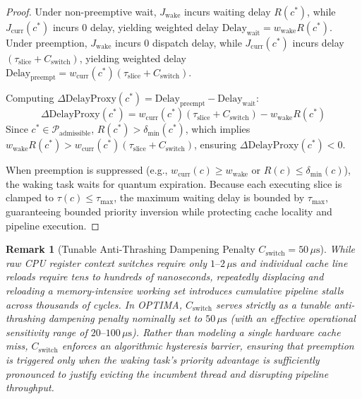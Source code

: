 \documentclass[conference]{IEEEtran}
\newtheorem{remark}{Remark}
\begin{document}
\begin{proof}
Under non-preemptive wait, $J_{\mathrm{wake}}$ incurs waiting delay $R(c^*)$, while $J_{\mathrm{curr}}(c^*)$ incurs 0 delay, yielding weighted delay $\mathrm{Delay}_{\mathrm{wait}} = w_{\mathrm{wake}} R(c^*)$. Under preemption, $J_{\mathrm{wake}}$ incurs 0 dispatch delay, while $J_{\mathrm{curr}}(c^*)$ incurs delay $(\tau_{\mathrm{slice}} + C_{\mathrm{switch}})$, yielding weighted delay $\mathrm{Delay}_{\mathrm{preempt}} = w_{\mathrm{curr}}(c^*) (\tau_{\mathrm{slice}} + C_{\mathrm{switch}})$.

Computing $\Delta\mathrm{DelayProxy}(c^*) = \mathrm{Delay}_{\mathrm{preempt}} - \mathrm{Delay}_{\mathrm{wait}}$:
\begin{equation}
\Delta\mathrm{DelayProxy}(c^*) = w_{\mathrm{curr}}(c^*) (\tau_{\mathrm{slice}} + C_{\mathrm{switch}}) - w_{\mathrm{wake}} R(c^*)
\end{equation}
Since $c^* \in \mathcal{P}_{\mathrm{admissible}}$, $R(c^*) > \delta_{\min}(c^*)$, which implies $w_{\mathrm{wake}} R(c^*) > w_{\mathrm{curr}}(c^*) (\tau_{\mathrm{slice}} + C_{\mathrm{switch}})$, ensuring $\Delta\mathrm{DelayProxy}(c^*) < 0$.

When preemption is suppressed (e.g., $w_{\mathrm{curr}}(c) \ge w_{\mathrm{wake}}$ or $R(c) \le \delta_{\min}(c)$), the waking task waits for quantum expiration. Because each executing slice is clamped to $\tau(c) \le \tau_{\max}$, the maximum waiting delay is bounded by $\tau_{\max}$, guaranteeing bounded priority inversion while protecting cache locality and pipeline execution.
\end{proof}

\begin{remark}[Tunable Anti-Thrashing Dampening Penalty $C_{\mathrm{switch}} = 50\,\mu\text{s}$]
While raw CPU register context switches require only $1\text{--}2\,\mu\text{s}$ and individual cache line reloads require tens to hundreds of nanoseconds, repeatedly displacing and reloading a memory-intensive working set introduces cumulative pipeline stalls across thousands of cycles. In OPTIMA, $C_{\mathrm{switch}}$ serves strictly as a \emph{tunable anti-thrashing dampening penalty} nominally set to $50\,\mu\text{s}$ (with an effective operational sensitivity range of $20\text{--}100\,\mu\text{s}$). Rather than modeling a single hardware cache miss, $C_{\mathrm{switch}}$ enforces an algorithmic hysteresis barrier, ensuring that preemption is triggered only when the waking task's priority advantage is sufficiently pronounced to justify evicting the incumbent thread and disrupting pipeline throughput.
\end{remark}
\end{document}
